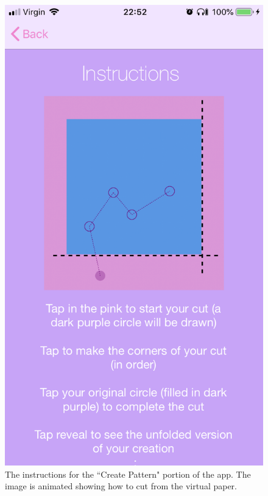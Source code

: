 \documentclass[11pt]{article}
\begin{document}
               \begin{figure}[!ht]
                                \begin{minipage}{0.45\textwidth}
                                    \centering \includegraphics[width=0.7\linewidth]{KiriZen/instructionsCreate.png}
                                    \caption{The instructions for the ``Create Pattern" portion of the app. The image is animated showing how to cut from the virtual paper.}
                                    \label{fig:kiriZen-instructionsCreate}
                                \end{minipage}\hfill
                                \begin{minipage}{0.45\textwidth}
                                    \centering

\end{minipage}
\end{figure}
\end{document}
